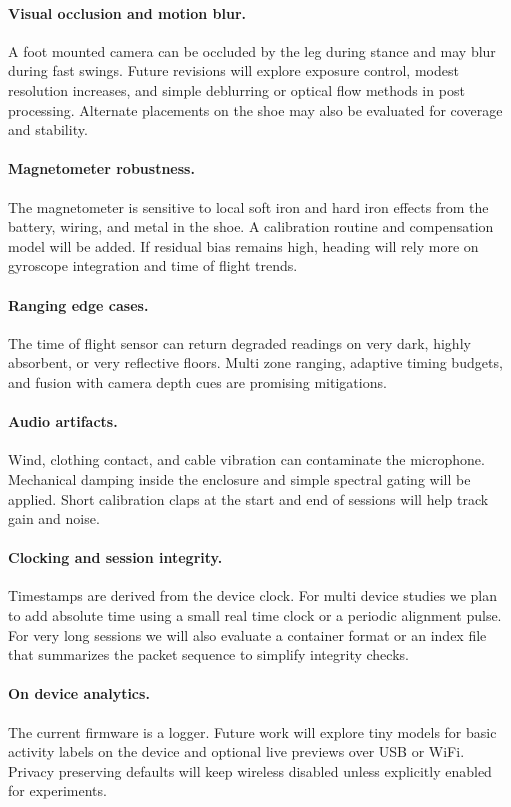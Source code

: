 \documentclass[manuscript,review,anonymous]{acmart}
\begin{document}
\paragraph{Visual occlusion and motion blur.}
A foot mounted camera can be occluded by the leg during stance and may blur during fast swings. Future revisions will explore exposure control, modest resolution increases, and simple deblurring or optical flow methods in post processing. Alternate placements on the shoe may also be evaluated for coverage and stability.

\paragraph{Magnetometer robustness.}
The magnetometer is sensitive to local soft iron and hard iron effects from the battery, wiring, and metal in the shoe. A calibration routine and compensation model will be added. If residual bias remains high, heading will rely more on gyroscope integration and time of flight trends.

\paragraph{Ranging edge cases.}
The time of flight sensor can return degraded readings on very dark, highly absorbent, or very reflective floors. Multi zone ranging, adaptive timing budgets, and fusion with camera depth cues are promising mitigations.

\paragraph{Audio artifacts.}
Wind, clothing contact, and cable vibration can contaminate the microphone. Mechanical damping inside the enclosure and simple spectral gating will be applied. Short calibration claps at the start and end of sessions will help track gain and noise.

\paragraph{Clocking and session integrity.}
Timestamps are derived from the device clock. For multi device studies we plan to add absolute time using a small real time clock or a periodic alignment pulse. For very long sessions we will also evaluate a container format or an index file that summarizes the packet sequence to simplify integrity checks.

\paragraph{On device analytics.}
The current firmware is a logger. Future work will explore tiny models for basic activity labels on the device and optional live previews over USB or WiFi. Privacy preserving defaults will keep wireless disabled unless explicitly enabled for experiments.
\end{document}
